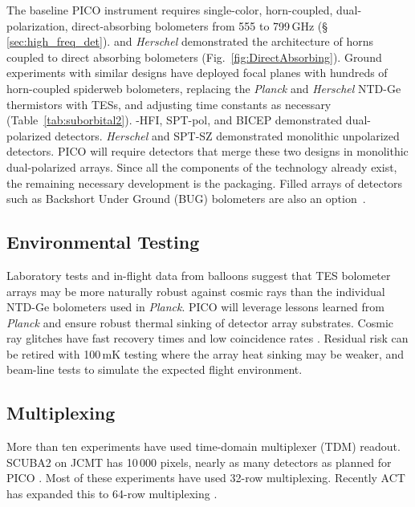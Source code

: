 The baseline PICO instrument requires single-color, horn-coupled, dual-polarization, direct-absorbing bolometers from 555 to 799\,GHz (\S\,\ref{sec:high_freq_det}).  \planck and \textit{Herschel} demonstrated the architecture of horns coupled to direct absorbing bolometers (Fig.~\ref{fig:DirectAbsorbing}).    Ground experiments with similar designs have deployed focal planes with hundreds of horn-coupled spiderweb bolometers, replacing the \textit{Planck} and \textit{Herschel} NTD-Ge thermistors with TESs, and adjusting time constants as necessary (Table~\ref{tab:suborbital2}). \planck -HFI, SPT-pol, and BICEP demonstrated dual-polarized detectors. \textit{Herschel} and SPT-SZ demonstrated monolithic unpolarized detectors. PICO will require detectors that merge these two designs in monolithic dual-polarized arrays. Since all the components of the technology already exist, the remaining necessary development is the packaging. Filled arrays of detectors such as Backshort Under Ground (BUG) bolometers are also an option~\citep{Staguhn2006}.




\subsection{Environmental Testing}
\label{sec:env_testing}

Laboratory tests and in-flight data from balloons suggest that TES
bolometer arrays may be more naturally robust against cosmic rays than
the individual NTD-Ge bolometers used in \textit{Planck}. PICO will leverage lessons
learned from \textit{Planck} and ensure robust thermal sinking of
detector array substrates. Cosmic ray
glitches have fast recovery times and low coincidence rates
\citep{SPIDER2018,Filippini_inprep}. Residual risk can be retired with 100\,mK
testing where the array heat sinking may be weaker, and beam-line
tests to simulate the expected flight environment.

\subsection{Multiplexing}
\label{sec:multiplexing}

More than ten experiments have used time-domain multiplexer (TDM)
readout. SCUBA2 on JCMT has 10\,000 pixels, nearly as many detectors
as planned for PICO \citep{Holland2013}. Most of these experiments
have used 32-row multiplexing. Recently ACT has expanded this to
64-row multiplexing \citep{Henderson2016}.

